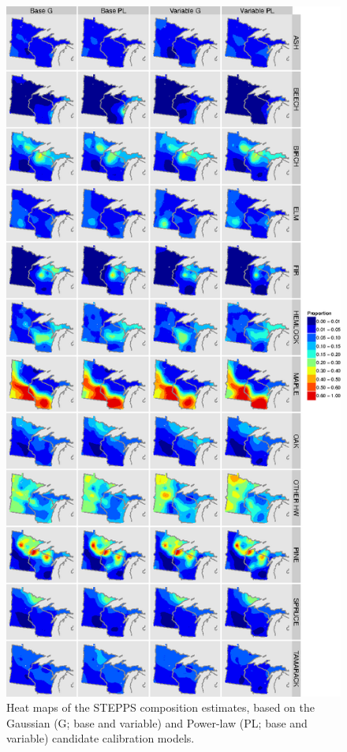 \begin{figure}
\centering
\includegraphics[width=4.5in]{figures/maps_predicted_veg.png}
\caption{Heat maps of the STEPPS composition estimates, based on the
  Gaussian (G; base and variable) and Power-law (PL; base and
  variable) candidate calibration models.}
\label{fig:maps_stepps_veg}
\end{figure}

